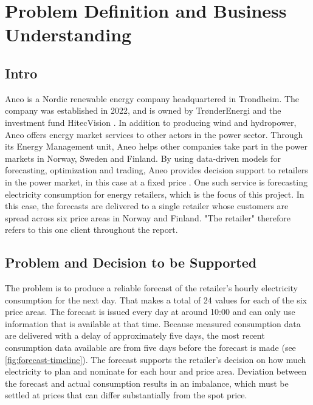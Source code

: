 \documentclass[11pt,a4paper]{article}
\begin{document}
\newpage
\begingroup
\small %
\tableofcontents
\endgroup
\newpage



\section{Problem Definition and Business Understanding}
\label{sec:problem}
\subsection{Intro}

Aneo is a Nordic renewable energy company headquartered in Trondheim. The company was established in 2022, and is owned by TrønderEnergi and the investment fund HitecVision \cite{aneo_sweden}. In addition to producing wind and hydropower, Aneo offers energy market services to other actors in the power sector. Through its Energy Management unit, Aneo helps other companies take part in the power markets in Norway, Sweden and Finland. By using data-driven models for forecasting, optimization and trading, Aneo provides decision support to retailers in the power market, in this case at a fixed price \cite{aneo_markets}. One such service is forecasting electricity consumption for energy retailers, which is the focus of this project. In this case, the forecasts are delivered to a single retailer whose customers are spread across six price areas in Norway and Finland. "The retailer" therefore refers to this one client throughout the report.

\subsection{Problem and Decision to be Supported}
\label{sec:decision}

The problem is to produce a reliable forecast of the retailer's hourly electricity consumption for the next day. That makes a total of 24 values for each of the six price areas. The forecast is issued every day at around 10:00 and can only use information that is available at that time. Because measured consumption data are delivered with a delay of approximately five days, the most recent consumption data available are from five days before the forecast is made (see \cref{fig:forecast-timeline}). The forecast supports the retailer's decision on how much electricity to plan and nominate for each hour and price area. Deviation between the forecast and actual consumption results in an imbalance, which must be settled at prices that can differ substantially from the spot price.
\end{document}
